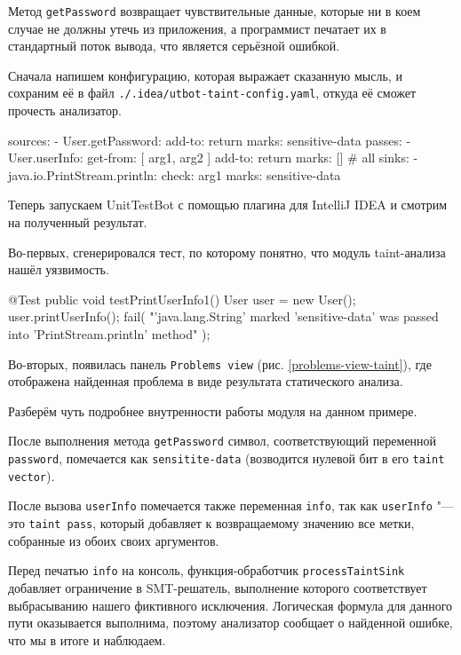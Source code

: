 Метод \verb|getPassword| возвращает чувствительные данные, которые ни в коем случае не должны утечь из приложения, а программист печатает их в стандартный поток вывода, что является серьёзной ошибкой.

Сначала напишем конфигурацию, которая выражает сказанную мысль, и сохраним её в файл \verb|./.idea/utbot-taint-config.yaml|, откуда её сможет прочесть анализатор.

\begin{nocode}
sources:
  - User.getPassword:
      add-to: return
      marks: sensitive-data
passes:
  - User.userInfo:
      get-from: [ arg1, arg2 ]
      add-to: return
      marks: [] # all
sinks:
  - java.io.PrintStream.println:
      check: arg1
      marks: sensitive-data
\end{nocode}

Теперь запускаем UnitTestBot с помощью плагина для IntelliJ IDEA и смотрим на полученный результат.

Во-первых, сгенерировался тест, по которому понятно, что модуль taint-анализа нашёл уязвимость.

\begin{code}
@Test
public void testPrintUserInfo1() {
    User user = new User();
    user.printUserInfo();
    fail(
        "'java.lang.String' marked 'sensitive-data' 
         was passed into 'PrintStream.println' method"
    );
}
\end{code}

Во-вторых, появилась панель \verb|Problems view| (рис. \ref{problems-view-taint}), где отображена найденная проблема в виде результата статического анализа.

Разберём чуть подробнее внутренности работы модуля на данном примере.

После выполнения метода \verb|getPassword| символ, соответствующий переменной \verb|password|, помечается как \verb|sensitite-data| (возводится нулевой бит в его \verb|taint vector|).

После вызова \verb|userInfo| помечается также переменная \verb|info|, так как \verb|userInfo| "--- это \verb|taint pass|, который добавляет к возвращаемому значению все метки, собранные из обоих своих аргументов.

Перед печатью \verb|info| на консоль, функция-обработчик \verb|processTaintSink| добавляет ограничение в SMT-решатель, выполнение которого соответствует выбрасыванию нашего фиктивного исключения. Логическая формула для данного пути оказывается выполнима, поэтому анализатор сообщает о найденной ошибке, что мы в итоге и наблюдаем.
